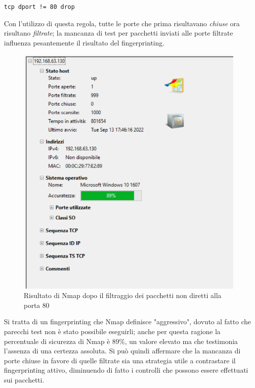 \begin{lstlisting}[caption={Regola per il blocco di tutti i pacchetti ricevuti non diretti alla porta 80}]
	tcp dport != 80 drop
\end{lstlisting}

Con l'utilizzo di questa regola, tutte le porte che prima risultavano \textit{chiuse} ora risultano \textit{filtrate}; la mancanza di test per pacchetti inviati alle porte filtrate influenza pesantemente il risultato del fingerprinting.

\begin{figure}[H]
	\centering
	\includegraphics[scale=0.85]{figures/windows_nmap.png}
	\caption{Risultato di Nmap dopo il filtraggio dei pacchetti non diretti alla porta 80}
	\label{windows_nmap}
\end{figure}

Si tratta di un fingerprinting che Nmap definisce "aggressivo", dovuto al fatto che parecchi test non è stato possibile eseguirli; anche per questa ragione la percentuale di sicurezza di Nmap è 89\%, un valore elevato ma che testimonia l'assenza di una certezza assoluta.
Si può quindi affermare che la mancanza di porte chiuse in favore di quelle filtrate sia una strategia utile a contrastare il fingerprinting attivo, diminuendo di fatto i controlli che possono essere effettuati sui pacchetti.

